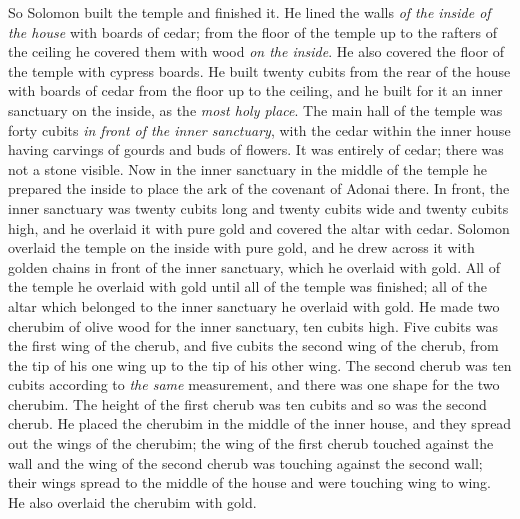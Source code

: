 \begin{biblechapter}
\verse So Solomon built the temple and finished it.
\verse He lined the walls \textit{of the inside of the house} with boards of cedar; from the floor of the temple up to the rafters of the ceiling he covered them with wood \textit{on the inside}. He also covered the floor of the temple with cypress boards.
\verse He built twenty cubits from the rear of the house with boards of cedar from the floor up to the ceiling, and he built for it an inner sanctuary on the inside, as the \textit{most holy place}.
\verse The main hall of the temple was forty cubits \textit{in front of the inner sanctuary},
\verse with the cedar within the inner house having carvings of gourds and buds of flowers. It was entirely of cedar; there was not a stone visible.
\verse Now in the inner sanctuary in the middle of the temple he prepared the inside to place the ark of the covenant of Adonai there.
\verse In front, the inner sanctuary was twenty cubits long and twenty cubits wide and twenty cubits high, and he overlaid it with pure gold and covered the altar with cedar.
\verse Solomon overlaid the temple on the inside with pure gold, and he drew across it with golden chains in front of the inner sanctuary, which he overlaid with gold.
\verse All of the temple he overlaid with gold until all of the temple was finished; all of the altar which belonged to the inner sanctuary he overlaid with gold.
\verse He made two cherubim of olive wood for the inner sanctuary, ten cubits high.
\verse Five cubits was the first wing of the cherub, and five cubits the second wing of the cherub, from the tip of his one wing up to the tip of his other wing.
\verse The second cherub was ten cubits according to \textit{the same} measurement, and there was one shape for the two cherubim.
\verse The height of the first cherub was ten cubits and so was the second cherub.
\verse He placed the cherubim in the middle of the inner house, and they spread out the wings of the cherubim; the wing of the first cherub touched against the wall and the wing of the second cherub was touching against the second wall; their wings spread to the middle of the house and were touching wing to wing.
\verse He also overlaid the cherubim with gold.

\end{biblechapter}
